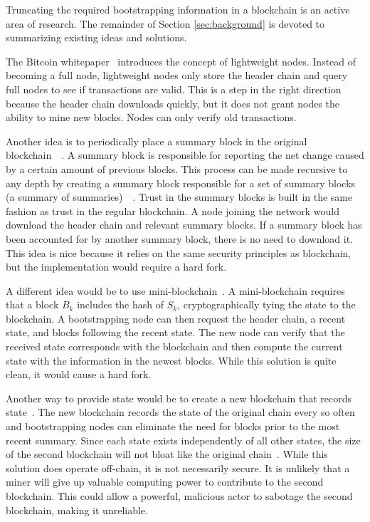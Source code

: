 Truncating the required bootstrapping information in a blockchain is an active area of research.
The remainder of Section \ref{sec:background} is devoted to summarizing existing ideas and solutions.


The Bitcoin whitepaper~\cite{nakamoto2009Bitcoin} introduces the concept of lightweight nodes.
Instead of becoming a full node, lightweight nodes only store the header chain and query full nodes to see if transactions are valid.
This is a step in the right direction because the header chain downloads quickly, but it does not grant nodes the ability to mine new blocks.
Nodes can only verify old transactions.


Another idea is to periodically place a summary block in the original blockchain~\cite{palai2018BlockSummariesSameChain}~\cite{nadiya2018BlockSummaries(ExtendsPalai)}.
A summary block is responsible for reporting the net change caused by a certain amount of previous blocks.
This process can be made recursive to any depth by creating a summary block responsible for a set of summary blocks (a summary of summaries)~\cite{palai2018BlockSummariesSameChain}~\cite{nadiya2018BlockSummaries(ExtendsPalai)}.
Trust in the summary blocks is built in the same fashion as trust in the regular blockchain.
A node joining the network would download the header chain and relevant summary blocks.
If a summary block has been accounted for by another summary block, there is no need to download it.
This idea is nice because it relies on the same security principles as blockchain, but the implementation would require a hard fork.


A different idea would be to use mini-blockchain~\cite{bruce2014Miniblockchain}.
A mini-blockchain requires that a block $B_k$ includes the hash of $S_k$, cryptographically tying the state to the blockchain.
A bootstrapping node can then request the header chain, a recent state, and blocks following the recent state.
The new node can verify that the received state corresponds with the blockchain and then compute the current state with the information in the newest blocks.
While this solution is quite clean, it would cause a hard fork.


Another way to provide state would be to create a new blockchain that records state~\cite{marsalek2019BockSummariesSeparateChain}.
The new blockchain records the state of the original chain every so often and bootstrapping nodes can eliminate the need for blocks prior to the most recent summary.
Since each state exists independently of all other states, the size of the second blockchain will not bloat like the original chain~\cite{marsalek2019BockSummariesSeparateChain}.
While this solution does operate off-chain, it is not necessarily secure.
It is unlikely that a miner will give up valuable computing power to contribute to the second blockchain.
This could allow a powerful, malicious actor to sabotage the second blockchain, making it unreliable.

